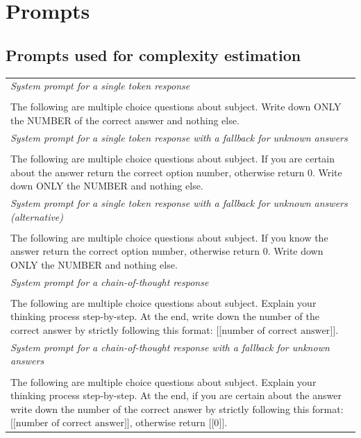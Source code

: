 \section{Prompts}
\label{sec:prompts}


\subsection{Prompts used for complexity estimation}
\label{sec:uq_prompts}

\begin{table}[H]
\small
\centering
\begin{tabularx}{\linewidth}{X}
\hline 
\emph{System prompt for a single token response} \\
\\
The following are multiple choice questions about {subject}. Write down ONLY the NUMBER of the correct answer and nothing else.
\\
\hline 
\emph{System prompt for a single token response with a fallback for unknown answers} \\
\\
The following are multiple choice questions about {subject}. If you are certain about the answer return the correct option number, otherwise return 0. Write down ONLY the NUMBER and nothing else. \\
\hline 
\emph{System prompt for a single token response with a fallback for unknown answers (alternative)} \\
\\
The following are multiple choice questions about {subject}. If you know the answer return the correct option number, otherwise return 0. Write down ONLY the NUMBER and nothing else.
\\
\hline 
\emph{System prompt for a chain-of-thought response} \\
\\
The following are multiple choice questions about {subject}. Explain your thinking process step-by-step. At the end, write down the number of the correct answer by strictly following this format: $\lbrack\lbrack\text{number of correct answer}\rbrack\rbrack$.
\\
\hline 
\emph{System prompt for a chain-of-thought response with a fallback for unknown answers} \\
\\
The following are multiple choice questions about {subject}. Explain your thinking process step-by-step. At the end, if you are certain about the answer write down the number of the correct answer by strictly following this format: $\lbrack\lbrack\text{number of correct answer}\rbrack\rbrack$, otherwise return $\lbrack\lbrack\text{0}\rbrack\rbrack$.

\end{tabularx}
\end{table}
